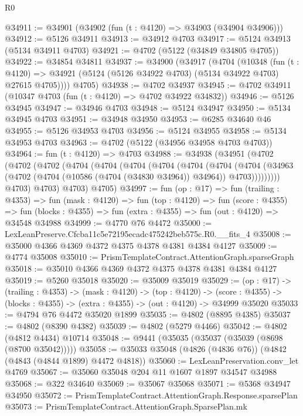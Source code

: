 \begin{lexlean}{R0}
\begin{coremodule}
@34911 := @34901 (@34902 (fun (t : @4120) => @34903 (@34904 @34906)))
@34912 := @5126 @34911
@34913 := @34912 @4703
@34917 := @5124 @34913 (@5134 @34911 @4703)
@34921 := @4702 (@5122 (@34849 @34805 @4705))
@34922 := @34854 @34811
@34937 := @34900
    (@34917
      (@4704
        (@10348
          (fun (t : @4120) =>
          @34921 (@5124 (@5126 @34922 @4703) (@5134 @34922 @4703) @27615 @4705))))
      @4705)
@34938 := @4702 @34937
@34945 := @4702 @34911 (@10347 @4703 (fun (t : @4120) => @4702 @34922 @34832))
@34946 := @5126 @34945
@34947 := @34946 @4703
@34948 := @5124 @34947
@34950 := @5134 @34945 @4703
@34951 := @34948 @34950
@34953 := @6285 @34640 @46
@34955 := @5126 @34953 @4703
@34956 := @5124 @34955
@34958 := @5134 @34953 @4703
@34963 := @4702 (@5122 (@34956 @34958 @4703 @4703))
@34964 := fun (t : @4120) => @4703
@34988 := @34938
    (@34951
      (@4702
        (@4702
          (@4702
            (@4704
              (@4704
                (@4704
                  (@4704
                    (@4704
                      (@4704
                        (@4704
                          (@34963
                            (@4702 (@4704 (@10586 (@4704 (@34830 @34964)) @34964)) @4703)))))))))
            @4703)
          @4703)
        @4703)
      @4705)
@34997 := fun (op : @17) =>
  fun (trailing : @4353) =>
  fun (mask : @4120) =>
  fun (top : @4120) =>
  fun (score : @4355) =>
  fun (blocks : @4355) => fun (extra : @4355) => fun (out : @4120) => @34548 @34988
@34999 := @4770 @76 @4472
@35000 := LexLeanPreserve.Cfcba11c5e72195ecadc475242beb575c.R0.__fits_4
@35008 := @35000 @4366 @4369 @4372 @4375 @4378 @4381 @4384 @4127
@35009 := @4774 @35008
@35010 := PrismTemplateContract.AttentionGraph.sparseGraph
@35018 := @35010 @4366 @4369 @4372 @4375 @4378 @4381 @4384 @4127
@35019 := @5260 @35018
@35020 := @35009 @35019
@35029 := (op : @17) ->
  (trailing : @4353) ->
  (mask : @4120) ->
  (top : @4120) ->
  (score : @4355) -> (blocks : @4355) -> (extra : @4355) -> (out : @4120) -> @34999 @35020
@35033 := @4794 @76 @4472 @35020 @1899
@35035 := @4802 (@8895 @4385)
@35037 := @4802 (@8390 @4382)
@35039 := @4802 (@5279 @4466)
@35042 := @4802 (@4812 @4434) @10714
@35048 := @9441 (@35035 (@35037 (@35039 (@8698 (@8700 @35042)))))
@35058 := @35033 @35048 (@4826 (@4836 @76)) (@4842 (@4843 (@4844 @1899) @4472 @4818))
@35060 := LexLeanPreservation.conv_let @4769
@35067 := @35060 @35048 @204 @11 @1607 @1897 @34547 @34988
@35068 := @322 @34640
@35069 := @35067 @35068
@35071 := @5368 @34947 @34950
@35072 := PrismTemplateContract.AttentionGraph.Response.sparsePlan
@35073 := PrismTemplateContract.AttentionGraph.SparsePlan.mk

\end{coremodule}
\end{lexlean}
